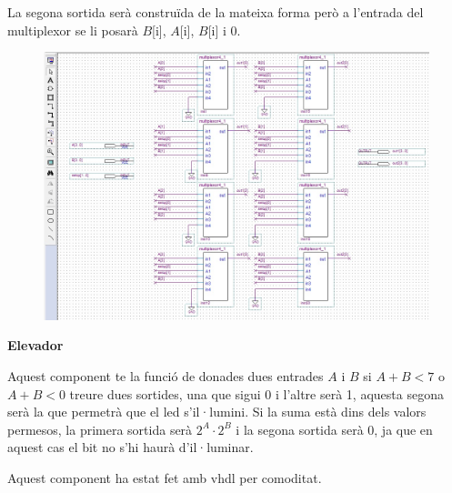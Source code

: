 \documentclass[12pt, a4papre]{article}
\begin{document}
	La segona sortida serà construïda de la mateixa forma però a l'entrada del multiplexor se li posarà $B$[i], $A$[i], $B$[i] i 0.
	
		\begin{center}
	\begin{figure}[H]
		\begin{center}
		\includegraphics[width=150mm]{selectormult.jpeg}
		\end{center}
	\end{figure}
	\end{center}
	
	\textbf{\large{Elevador}}
	
	Aquest component te la funció de donades dues entrades $A$ i $B$ si $A + B < 7$ o $A + B < 0$ treure dues sortides, una que sigui 0 i l'altre serà 1, aquesta segona serà la que permetrà que el led s'il·lumini. Si la suma està dins dels valors permesos, la primera sortida serà $2^A\cdot2^B$ i la segona sortida serà 0, ja que en aquest cas el bit no s'hi haurà d'il·luminar.
	
	Aquest component ha estat fet amb vhdl per comoditat.
	
\end{document}

